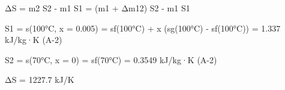 ΔS = m2 S2 - m1 S1 = (m1 + Δm12) S2 - m1 S1  

S1 = s(100°C, x = 0.005) = sf(100°C) + x (sg(100°C) - sf(100°C)) = 1.337 kJ/kg·K (A-2)  

S2 = s(70°C, x = 0) = sf(70°C) = 0.3549 kJ/kg·K (A-2)  

ΔS = 1227.7 kJ/K
